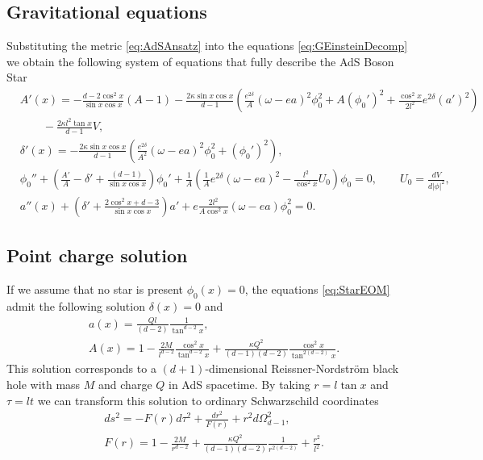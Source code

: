 \documentclass[a4paper,12pt]{article}
\begin{document}
\subsection{Gravitational equations}
Substituting the metric \eqref{eq:AdSAnsatz} into the equations \eqref{eq:GEinsteinDecomp} we obtain the following system of equations that fully describe the AdS Boson Star
\begin{subequations}
\label{eq:StarEOM}
\begin{align}
	&A'(x) = - \frac{d - 2 \cos^2 x}{\sin x \cos x}\left(A - 1\right) - \frac{2 \kappa \sin x \cos x}{d - 1} \left(\frac{e^{2\delta}}{A}(\omega - e a)^2 \phi_0^2 + A(\phi_0')^2 + \frac{\cos^2 x}{2l^2} e^{2\delta} (a')^2\right)\\\nonumber
	&\qquad - \frac{2 \kappa l^2 \tan x}{d - 1} V,\\
	&\delta'(x) = -\frac{2\kappa \sin x \cos x}{d - 1} \left(\frac{e^{2\delta}}{A^2}(\omega - e a)^2 \phi_0^2 + (\phi_0')^2\right),\\
	\label{eq:ScalarEOM}
	&\phi_0'' + \left(\frac{A'}{A} - \delta' + \frac{(d-1)}{\sin x \cos x}\right)\phi_0' + \frac{1}{A}\left(\frac{1}{A}e^{2\delta}(\omega - e a)^2 - \frac{l^2}{\cos^2 x } U_0\right) \phi_0 = 0,\qquad U_0 = \frac{d V}{d |\phi|^2},\\
	&a''(x) + \left(\delta' + \frac{2\cos^2 x + d - 3}{\sin x \cos x}\right) a' + e\frac{2 l^2}{A\cos^2 x} (\omega - e a) \phi_0^2 = 0.
\end{align}
\end{subequations}

\subsection{Point charge solution}
If we assume that no star is present $\phi_0(x) = 0$, the equations \eqref{eq:StarEOM} admit the following solution $\delta(x) = 0$ and
\begin{subequations}
\label{eq:PointCharge}
\begin{align}
	&a(x) = \frac{Q l}{(d-2)}\frac{1}{\tan^{d-2} x},\\
	&A(x) = 1 - \frac{2 M}{l^{d-2}} \frac{\cos^2 x}{\tan^{d-2} x} + \frac{\kappa Q^2}{(d-1)(d-2)} \frac{\cos^2 x}{\tan^{2(d-2)} x}.
\end{align}
\end{subequations}
This solution corresponds to a $(d+1)$-dimensional Reissner-Nordstr\"{o}m black hole with mass $M$ and charge $Q$ in AdS spacetime. By taking $r = l \tan x$ and $\tau = l t$ we can transform this solution to ordinary Schwarzschild coordinates
\begin{equation}
\begin{split}
	&ds^2 = - F(r) d\tau^2 + \frac{dr^2}{F(r)} + r^2 d \Omega^2_{d-1},\\
	&F(r) = 1 - \frac{2M}{r^{d-2}} + \frac{\kappa Q^2}{(d-1)(d-2)}\frac{1}{r^{2(d-2)}} + \frac{r^2}{l^2}.
\end{split}
\end{equation}
\end{document}

